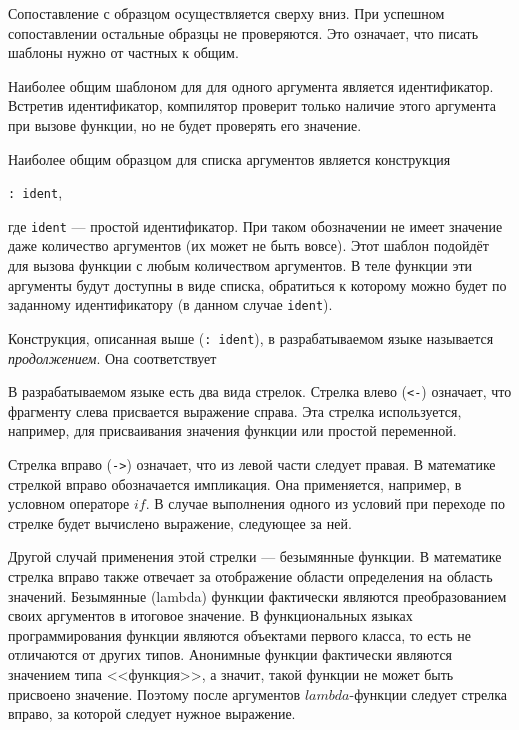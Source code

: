         Сопоставление с образцом осуществляется сверху вниз.
        При успешном сопоставлении остальные образцы не проверяются.
        Это означает, что писать шаблоны нужно от частных к общим.

        Наиболее общим шаблоном для для одного аргумента является идентификатор.
        Встретив идентификатор, компилятор проверит только наличие этого аргумента при вызове функции, но не будет проверять его значение.

        Наиболее общим образцом для списка аргументов является конструкция

        \verb!: ident!,

        где \verb!ident! --- простой идентификатор.
        При таком обозначении не имеет значение даже количество аргументов (их может не быть вовсе).
        Этот шаблон подойдёт для вызова функции с любым количеством аргументов.
        В теле функции эти аргументы будут доступны в виде списка, обратиться к которому можно будет по заданному идентификатору (в данном случае \verb!ident!).

        Конструкция, описанная выше (\verb!: ident!), в разрабатываемом языке называется \textit{продолжением}.
        Она соответствует 

        В разрабатываемом языке есть два вида стрелок.
        Стрелка влево (\verb!<-!) означает, что фрагменту слева присвается выражение справа.
        Эта стрелка используется, например, для присваивания значения функции или простой переменной.

        Стрелка вправо (\verb!->!) означает, что из левой части следует правая.
        В математике стрелкой вправо обозначается импликация.
        Она применяется, например, в условном операторе $if$.
        В случае выполнения одного из условий при переходе по стрелке будет вычислено выражение, следующее за ней.
        
        Другой случай применения этой стрелки --- безымянные функции.
        В математике стрелка вправо также отвечает за отображение области определения на область значений.
        Безымянные (lambda) функции фактически являются преобразованием своих аргументов в итоговое значение.
        В функциональных языках программирования функции являются объектами первого класса, то есть не отличаются от других типов.
        Анонимные функции фактически являются значением типа <<функция>>, а значит, такой функции не может быть присвоено значение.
        Поэтому после аргументов $lambda$-функции следует стрелка вправо, за которой следует нужное выражение.

